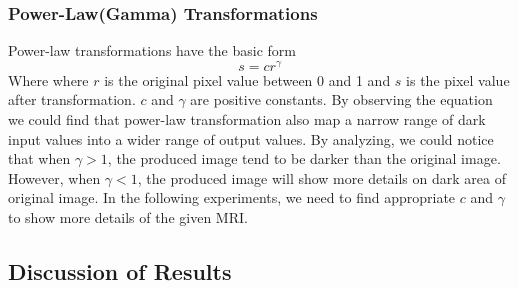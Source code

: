 \subsubsection{Power-Law(Gamma) Transformations}
Power-law transformations have the basic form
$$ s = cr^{\gamma} $$
Where where $r$ is the original pixel value between 0 and 1 and $s$ is the pixel value after transformation. $c$ and $ \gamma $ are positive constants. By observing the equation we could find that power-law transformation also map a narrow range of dark input values into a wider range of output values. By analyzing, we could notice that when $\gamma > 1$, the produced image tend to be darker than the original image. However, when $\gamma < 1$, the produced image will show more details on dark area of original image. In the following experiments, we need to find appropriate $c$ and $\gamma$ to show more details of the given MRI.
\subsection{Discussion of Results}
